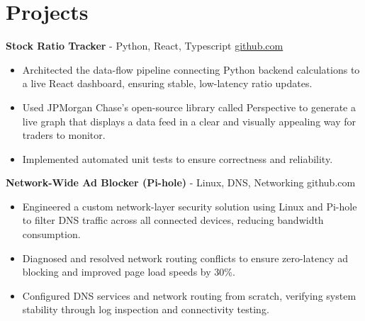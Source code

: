 \documentclass[11pt]{article}       %
\begin{document}

\vspace{-18.5pt}

\section*{Projects}

\textbf{Stock Ratio Tracker}{ - Python, React, Typescript} \hfill \href{https://github.com/Monica20030707/tradingDashboard-UI}{github.com} \\
\vspace{-9pt}
\begin{itemize}
  \item Architected the data-flow pipeline connecting Python backend calculations to a live React dashboard, ensuring stable, low-latency ratio updates. 
  \item Used JPMorgan Chase’s open-source library called Perspective to generate a live graph that displays a data feed in a clear and visually appealing way for traders to monitor.
  \item Implemented automated unit tests to ensure correctness and reliability.
\end{itemize}


\textbf{Network-Wide Ad Blocker (Pi-hole)}{ - Linux, DNS, Networking} \hfill github.com \\
\vspace{-9pt}
\begin{itemize} 
  \item Engineered a custom network-layer security solution using Linux and Pi-hole to filter DNS traffic across all connected devices, reducing bandwidth consumption.
  \item Diagnosed and resolved network routing conflicts to ensure zero-latency ad blocking and improved page load speeds by 30\%.
  \item Configured DNS services and network routing from scratch, verifying system stability through log inspection and connectivity testing.
\end{itemize}
\end{document}
